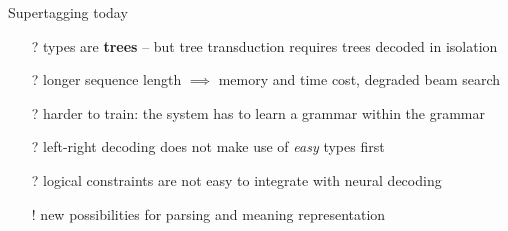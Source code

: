 \documentclass{beamer}
\begin{document}
\begin{frame}{Supertagging today}
	\smaller
	\begin{itemize}
		\item[?] types are \textbf{trees} -- but tree transduction requires trees decoded in isolation
		\pause
		\item[?] longer sequence length $\implies$ memory and time cost, degraded beam search
		\pause
		\item[?] harder to train: the system has to learn a grammar within the grammar
		\pause
		\item[?] left-right decoding does not make use of \textit{easy} types first
		\pause
		\item[?] logical constraints are not easy to integrate with neural decoding
		\pause
		\item[!] new possibilities for parsing and meaning representation
	\end{itemize}
	
\end{frame}
\end{document}
